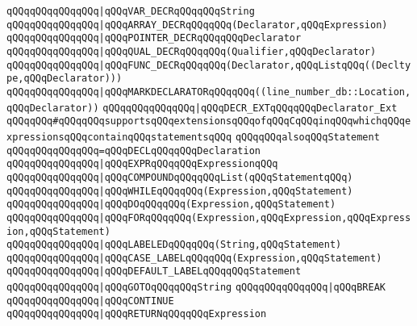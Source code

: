 \verb|qQQqqQQqqQQqqQQq|\verb#|qQQqVAR_DECRqQQqqQQqString#\newline
\verb|qQQqqQQqqQQqqQQq|\verb#|qQQqARRAY_DECRqQQqqQQq(Declarator,qQQqExpression)#\newline
\verb|qQQqqQQqqQQqqQQq|\verb#|qQQqPOINTER_DECRqQQqqQQqDeclarator#\newline
\verb|qQQqqQQqqQQqqQQq|\verb#|qQQqQUAL_DECRqQQqqQQq(Qualifier,qQQqDeclarator)#\newline
\verb|qQQqqQQqqQQqqQQq|\verb#|qQQqFUNC_DECRqQQqqQQq(Declarator,qQQqListqQQq((Decltype,qQQqDeclarator)))#\newline
\verb|qQQqqQQqqQQqqQQq|\verb#|qQQqMARKDECLARATORqQQqqQQq((line_number_db::Location,qQQqDeclarator))#\newline
\verb|qQQqqQQqqQQqqQQq|\verb#|qQQqDECR_EXTqQQqqQQqDeclarator_Ext#\newline
\newline
\verb|qQQqqQQq#qQQqqQQqsupportsqQQqextensionsqQQqofqQQqCqQQqinqQQqwhichqQQqexpressionsqQQqcontainqQQqstatementsqQQq|\newline
\verb|qQQqqQQqalsoqQQqStatement|\newline
\verb|qQQqqQQqqQQqqQQq=qQQqDECLqQQqqQQqDeclaration|\newline
\verb|qQQqqQQqqQQqqQQq|\verb#|qQQqEXPRqQQqqQQqExpressionqQQq#\newline
\verb|qQQqqQQqqQQqqQQq|\verb#|qQQqCOMPOUNDqQQqqQQqList(qQQqStatementqQQq)#\newline
\verb|qQQqqQQqqQQqqQQq|\verb#|qQQqWHILEqQQqqQQq(Expression,qQQqStatement)#\newline
\verb|qQQqqQQqqQQqqQQq|\verb#|qQQqDOqQQqqQQq(Expression,qQQqStatement)#\newline
\verb|qQQqqQQqqQQqqQQq|\verb#|qQQqFORqQQqqQQq(Expression,qQQqExpression,qQQqExpression,qQQqStatement)#\newline
\verb|qQQqqQQqqQQqqQQq|\verb#|qQQqLABELEDqQQqqQQq(String,qQQqStatement)#\newline
\verb|qQQqqQQqqQQqqQQq|\verb#|qQQqCASE_LABELqQQqqQQq(Expression,qQQqStatement)#\newline
\verb|qQQqqQQqqQQqqQQq|\verb#|qQQqDEFAULT_LABELqQQqqQQqStatement#\newline
\verb|qQQqqQQqqQQqqQQq|\verb#|qQQqGOTOqQQqqQQqString#\newline
\verb|qQQqqQQqqQQqqQQq|\verb#|qQQqBREAK#\newline
\verb|qQQqqQQqqQQqqQQq|\verb#|qQQqCONTINUE#\newline
\verb|qQQqqQQqqQQqqQQq|\verb#|qQQqRETURNqQQqqQQqExpression#\newline
